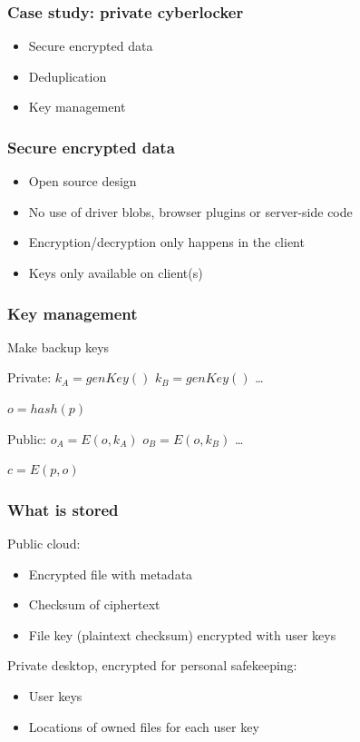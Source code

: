 \documentclass{beamer}
\begin{document}
\begin{frame}
    \frametitle{Case study: private cyberlocker}
    \begin{itemize}
    \item Secure encrypted data
    \item Deduplication
    \item Key management
    \end{itemize}
\end{frame}

\begin{frame}
    \frametitle{Secure encrypted data}
    \begin{itemize}
    \item Open source design
    \item No use of driver blobs, browser plugins or server-side code
    \item Encryption/decryption only happens in the client
    \item Keys only available on client(s)
    \end{itemize}
\end{frame}


\begin{frame}
    \frametitle{Key management}
    Make backup keys

    Private:
    $k_A = genKey()$
    $k_B = genKey()$
    \dots

    $o = hash(p)$

    Public:
    $o_A = E(o, k_A)$
    $o_B = E(o, k_B)$
    \dots

    $c = E(p,o)$
\end{frame}

\begin{frame}
    \frametitle{What is stored}
    Public cloud:
    \begin{itemize}
    \item Encrypted file with metadata
    \item Checksum of ciphertext
    \item File key (plaintext checksum) encrypted with user keys
    \end{itemize}

    Private desktop, encrypted for personal safekeeping:
    \begin{itemize}
    \item User keys
    \item Locations of owned files for each user key
    \end{itemize}
\end{frame}
\end{document}
